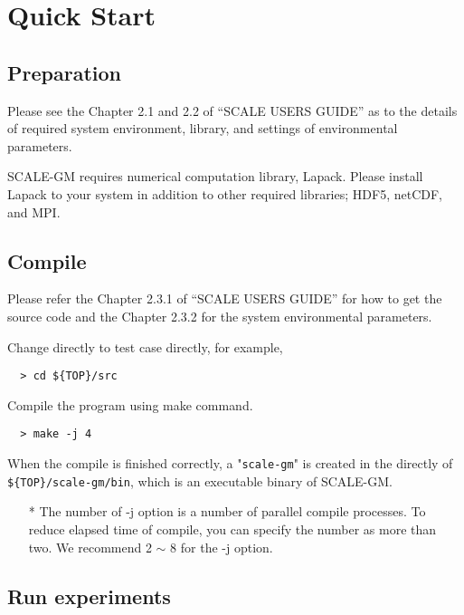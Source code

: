\section{Quick Start}

\subsection{Preparation}

Please see the Chapter 2.1 and 2.2 of ``SCALE USERS GUIDE''
as to the details of required system environment, library, and settings of environmental parameters.

SCALE-GM requires numerical computation library, Lapack.
Please install Lapack to your system in addition to other required libraries; HDF5, netCDF, and MPI.


\subsection{Compile}
Please refer the Chapter 2.3.1 of ``SCALE USERS GUIDE'' for how to get the source code
and the Chapter 2.3.2 for the system environmental parameters.

Change directly to test case directly, for example,
\begin{verbatim}
  > cd ${TOP}/src
\end{verbatim}

\noindent Compile the program using make command.
\begin{verbatim}
  > make -j 4
\end{verbatim}
When the compile is finished correctly,
a "\verb|scale-gm|" is created
in the directly of \verb|${TOP}/scale-gm/bin|, which is an executable binary of SCALE-GM.

\begin{itemize}
  \item[*] The number of -j option is a number of parallel compile processes.
   To reduce elapsed time of compile, you can specify the number
   as more than two. We recommend 2 $\sim$ 8 for the -j option.
\end{itemize}

\subsection{Run experiments}
